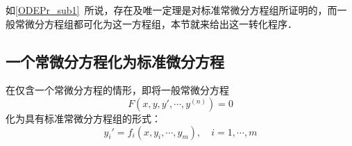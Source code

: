 
如\autoref{ODEPr_sub1}~所说，存在及唯一定理是对标准常微分方程组所证明的，而一般常微分方程组都可化为这一方程组，本节就来给出这一转化程序．

\subsection{一个常微分方程化为标准微分方程}
在仅含一个常微分方程的情形，即将一般常微分方程
\begin{equation}
F(x,y,y',\cdots,y^{(n)})=0
\end{equation}
化为具有标准常微分方程组的形式：
\begin{equation}
y_i'=f_i(x,y_i,\cdots,y_m),\quad i=1,\cdots,m
\end{equation}

